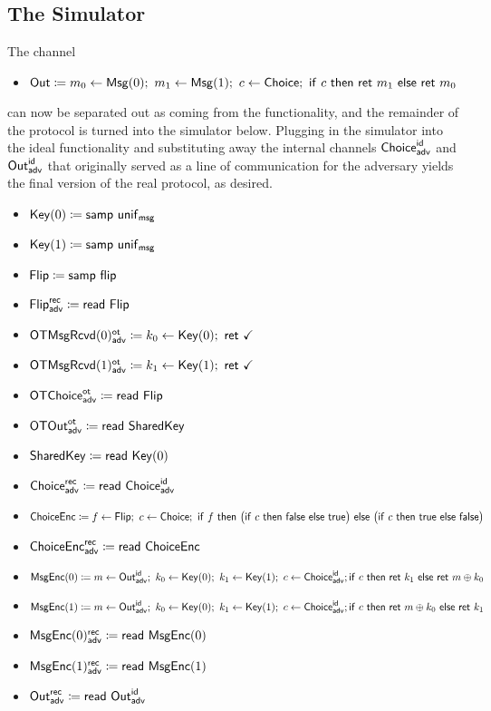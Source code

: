\subsection{The Simulator}
The channel
\begin{itemize}
\item $\Out \coloneqq m_0 \leftarrow \Msg(0); \ m_1 \leftarrow \Msg(1); \ c \leftarrow \Choice; \ \ifte{c}{\ret{m_1}}{\ret{m_0}}$
\end{itemize}
can now be separated out as coming from the functionality, and the remainder of the protocol is turned into the simulator below. Plugging in the simulator into the ideal functionality and substituting away the internal channels $\mathsf{Choice}^{\mathsf{id}}_{\mathsf{adv}}$ and $\mathsf{Out}^{\mathsf{id}}_{\mathsf{adv}}$ that originally served as a line of communication for the adversary yields the final version of the real protocol, as desired.

\begin{itemize}
\item $\mathsf{Key}(0) \coloneqq \mathsf{samp} \ \mathsf{unif}_{\mathsf{msg}}$
\item $\mathsf{Key}(1) \coloneqq \mathsf{samp} \ \mathsf{unif}_{\mathsf{msg}}$
\item $\mathsf{Flip} \coloneqq \mathsf{samp} \ \mathsf{flip}$
\item {\color{blue} $\mathsf{Flip}^{\mathsf{rec}}_{\mathsf{adv}} \coloneqq \mathsf{read} \ \mathsf{Flip}$}
\item {\color{blue} $\LeakOTMsgRcvd(0)^\ot_\adv \coloneqq k_0 \leftarrow \Key(0); \ \ret{\checkmark}$}
\item {\color{blue} $\LeakOTMsgRcvd(1)^\ot_\adv \coloneqq k_1 \leftarrow \Key(1); \ \ret{\checkmark}$}
\item {\color{blue} $\mathsf{OTChoice}^{\mathsf{ot}}_{\mathsf{adv}} \coloneqq \mathsf{read} \ \mathsf{Flip}$}
\item {\color{blue} $\mathsf{OTOut}^{\mathsf{ot}}_{\mathsf{adv}} \coloneqq \mathsf{read} \ \mathsf{SharedKey}$}
\item $\mathsf{SharedKey} \coloneqq \mathsf{read} \ \mathsf{Key}(0)$
\item $\mathsf{Choice}^{\mathsf{rec}}_{\mathsf{adv}} \coloneqq \mathsf{read} \ \mathsf{Choice}^{\mathsf{id}}_{\mathsf{adv}}$
\item $\ChoiceEnc \coloneqq f \leftarrow \Flip; \ c \leftarrow \Choice; \ \ifte{f}{\big(\ifte{c}{\false}{\true}\big)}{\big(\ifte{c}{\true}{\false}\big)}$
\item {\color{blue} $\mathsf{ChoiceEnc}^{\mathsf{rec}}_{\mathsf{adv}} \coloneqq \mathsf{read} \ \mathsf{ChoiceEnc}$}
\item $\MsgEnc(0) \coloneqq m \leftarrow \LeakOut^\id_\adv; \ k_0 \leftarrow \Key(0); \ k_1 \leftarrow \Key(1); \ c \leftarrow \LeakChoice^\id_\adv; \\ \ifte{c}{\ret{k_1}}{\ret{m \oplus k_0}}$
\item $\MsgEnc(1) \coloneqq m \leftarrow \LeakOut^\id_\adv; \ k_0 \leftarrow \Key(0); \ k_1 \leftarrow \Key(1); \ c \leftarrow \LeakChoice^\id_\adv; \\ \ifte{c}{\ret{m \oplus k_0}}{\ret{k_1}}$
\item {\color{blue} $\mathsf{MsgEnc}(0)^{\mathsf{rec}}_{\mathsf{adv}} \coloneqq \mathsf{read} \ \mathsf{MsgEnc}(0)$}
\item {\color{blue} $\mathsf{MsgEnc}(1)^{\mathsf{rec}}_{\mathsf{adv}} \coloneqq \mathsf{read} \ \mathsf{MsgEnc}(1)$}
\item {\color{blue} $\mathsf{Out}^{\mathsf{rec}}_{\mathsf{adv}} \coloneqq \mathsf{read} \ \mathsf{Out}^{\mathsf{id}}_{\mathsf{adv}}$}
\end{itemize}